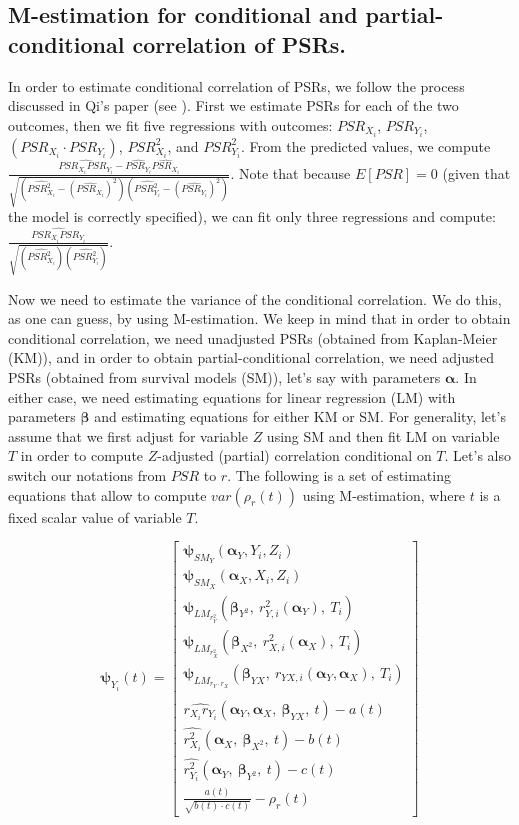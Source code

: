 \documentclass[]{article}
\begin{document}
\subsection{M-estimation for conditional and partial-conditional correlation of PSRs.}
In order to estimate conditional correlation of PSRs, we follow the process discussed in Qi's paper (see \cite{liu2016covariate}). First we estimate PSRs for each of the two outcomes, then we fit five regressions with outcomes: $PSR_{X_i}$, $PSR_{Y_i}$, $(PSR_{X_i}\cdot PSR_{Y_i})$, $PSR_{X_i}^2$, and $PSR_{Y_i}^2$. From the predicted values, we compute $\frac{\widehat{PSR_{X_i}PSR_{Y_i}} - \widehat{PSR_{Y_i}}\widehat{PSR_{X_i}}}{\sqrt{\left(\widehat{PSR_{X_i}^2} - (\widehat{PSR_{X_i}})^2 \right)\left(\widehat{PSR_{Y_i}^2} - (\widehat{PSR_{Y_i}})^2 \right)}}$. Note that because $E\left[ PSR \right] = 0$ (given that the model is correctly specified), we can fit only three regressions and compute: $\frac{\widehat{PSR_{X_i}PSR_{Y_i}}}{\sqrt{\left(\widehat{PSR_{X_i}^2}  \right)\left(\widehat{PSR_{Y_i}^2}  \right)}}$.

Now we need to estimate the variance of the conditional correlation. We do this, as one can guess, by using M-estimation. We keep in mind that in order to obtain conditional correlation, we need unadjusted PSRs (obtained from Kaplan-Meier (KM)), and in order to obtain partial-conditional correlation, we need adjusted PSRs (obtained from survival models (SM)), let's say with parameters $\pmb{\alpha}$. In either case, we need estimating equations for linear regression (LM) with parameters $\pmb{\beta}$ and estimating equations for either KM or SM. For generality, let's assume that we first adjust for variable $Z$ using SM and then fit LM on variable $T$ in order to compute $Z$-adjusted (partial) correlation conditional on $T$. Let's also switch our notations from  $PSR$ to $r$. The following is a set of estimating equations that allow to compute $var(\rho_r(t))$ using M-estimation, where $t$ is a fixed scalar value of variable $T$.

\[
\pmb{\psi}_{Y_i}(t) = 
	\begin{bmatrix}
		\pmb{\psi}_{SM_{Y}}(\pmb{\alpha}_Y, Y_i, Z_i)\\
		\pmb{\psi}_{SM_{X}}(\pmb{\alpha}_X, X_i, Z_i)\\
		\pmb{\psi}_{LM_{r^2_Y}}(\pmb{\beta}_{Y^2}, ~r^2_{Y,i}(\pmb{\alpha}_Y), ~T_i)\\
		\pmb{\psi}_{LM_{r^2_X}}(\pmb{\beta}_{X^2}, ~r^2_{X,i}(\pmb{\alpha}_X), ~T_i)\\
		\pmb{\psi}_{LM_{r_Y\cdot r_X}}(\pmb{\beta}_{YX}, ~r_{YX,i}(\pmb{\alpha}_Y, \pmb{\alpha}_X),  ~T_i)\\
     ~\\
    \widehat{r_{X_i}r_{Y_i}}(\pmb{\alpha}_Y, \pmb{\alpha}_X, ~\pmb{\beta}_{YX}, ~t) - a(t) \\
 \widehat{r_{X_i}^2} (\pmb{\alpha}_X, ~\pmb{\beta}_{X^2},~t) - b(t)\\
 \widehat{r_{Y_i}^2} (\pmb{\alpha}_Y, ~\pmb{\beta}_{Y^2},~t) - c(t)\\
    \frac{a(t)}{ \sqrt{b(t) \cdot c(t)}} - \rho_{r}(t)
 	\end{bmatrix} 
\]
\end{document}
